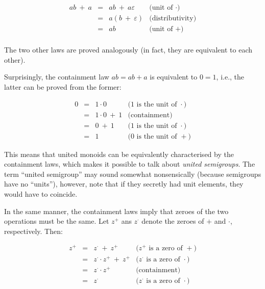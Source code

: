 \documentclass[english,submission]{programming}
\begin{document}
\vspace{-5mm}
\begin{equation*}
\begin{array}{rcll}
ab\ +\ a & = & ab\ +\ a\varepsilon & \text{(unit of $\cdot$)}\\
 & = & a(b\ +\ \varepsilon) & \text{(distributivity)}\\
 & = & ab & \text{(unit of $+$)}\\
\end{array}
\end{equation*}
\vspace{-3mm}

\noindent
The two other laws are proved analogously (in fact, they are equivalent to each
other).

Surprisingly, the containment law $ab = ab + a$ is equivalent to $0 = 1$, i.e.,
the latter can be proved from the former:

\vspace{-5mm}
\begin{equation*}
\begin{array}{rcll}
0 & = & 1\cdot0 & \text{($1$ is the unit of $\cdot$)}\\
 & = & 1\cdot0\ +\ 1 & \text{(containment)}\\
 & = & 0\ +\ 1 & \text{($1$ is the unit of $\cdot$)}\\
 & = & 1 & \text{($0$ is the unit of $+$)}
\end{array}
\end{equation*}
\vspace{-3mm}

\noindent
This means that united monoids can be equivalently characterised by the
containment laws, which makes it possible to talk about
\emph{united semigroups}. The term ``united semigroup'' may sound somewhat
nonsensically (because semigroups have no ``units''), however, note that if they
secretly had unit elements, they would have to coincide.

In the same manner, the containment laws imply that zeroes of the two operations
must be the same. Let $z^{+}$ ans $z^{\cdot}$ denote the zeroes of $+$ and
$\cdot$, respectively. Then:

\vspace{-5mm}
\begin{equation*}
\begin{array}{rcll}
z^{+} & = & z^{\cdot}\ +\ z^{+} & \text{($z^{+}$ is a zero of $+$)}\\
 & = & z^{\cdot} \cdot z^{+}\ +\ z^{+} & \text{($z^{\cdot}$ is a zero of $\cdot$)}\\
 & = & z^{\cdot} \cdot z^{+} & \text{(containment)}\\
 & = & z^{\cdot} & \text{($z^{\cdot}$ is a zero of $\cdot$)}
\end{array}
\end{equation*}
\vspace{-3mm}
\end{document}
